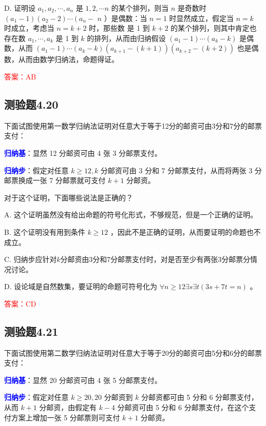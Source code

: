 \documentclass[UTF8, heading=true]{ctexart}
\begin{document}
D. 证明设 $a_1, a_2, \cdots, a_n$ 是 $1,2, \cdots n$ 的某个排列，则当 $n$ 是奇数时 $\left(a_1-1\right)\left(a_2-2\right) \cdots\left(a_n-\right.$ $n$ ）是偶数：当 $n=1$ 时显然成立，假定当 $n=k$ 时成立，考虑当 $n=k+2$ 时，那些数
是 1 到 $k+2$ 的某个排列，则其中肯定也存在数 $a_1, \cdots, a_k$ 是 1 到 $k$ 的排列，从而由归纳假设 $\left(a_1-1\right) \cdots\left(a_k-k\right)$ 是偶数，从而 $\left(a_1-1\right) \cdots\left(a_k-k\right)\left(a_{k+1}-(k+1)\right)\left(a_{k+2}-(k+2)\right)$ 也是偶数，从而由数学归纳法，命题得证。


\textcolor{red}{答案：AB}

\subsection{测验题4.20}

下面试图使用第一数学归纳法证明对任意大于等于12分的邮资可由3分和7分的邮票支付：

\textcolor{blue}{\textbf{归纳基}}：显然 12 分邮资可由 4 张 3 分邮票支付。

\textcolor{blue}{\textbf{归纳步}}：假定对任意 $k \geq 12, k$ 分邮资可由 3 分和 7 分邮票支付，从而将两张 3 分邮票换成一张 7 分邮票就可支付 $k+1$ 分邮资。

对于这个证明，下面哪些说法是正确的？

A. 
这个证明虽然没有给出命题的符号化形式，不够规范，但是一个正确的证明。

B. 
这个证明没有用到条件 $k \geq 12$ ，因此不是正确的证明，从而要证明的命题也不成立。

C. 
归纳步应针对$k$分邮资由3分和7分邮票支付时，对是否至少有两张3分邮票分情况讨论。

D. 
设论域是自然数集，要证明的命题可符号化为 $\forall n \geq 12 \exists s \exists t(3 s+7 t=n)$ 。


\textcolor{red}{答案：CD}

\subsection{测验题4.21}

下面试图使用第二数学归纳法证明对任意大于等于20分的邮资可由5分和6分的邮票支付：

\textcolor{blue}{\textbf{归纳基}}：显然 20 分邮资可由 4 张 5 分邮票支付。

\textcolor{blue}{\textbf{归纳步}}：假定对任意 $k \geq 20,20$ 分邮资到 $k$ 分邮资都可由 5 分和 6 分邮票支付，从而 $k+1$ 分邮资，由假定有 $k-4$ 分邮资可由 5 分和 6 分邮票支付，在这个支付方案上增加一张 5 分邮票则可支付 $k+1$ 分邮资。
\end{document}
